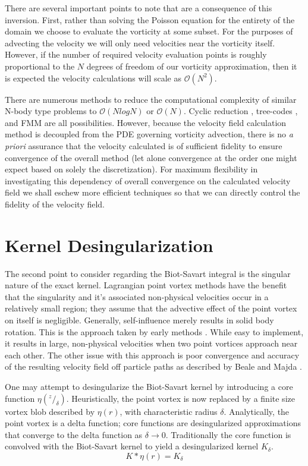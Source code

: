 \documentclass[letterpaper,12pt]{report}
\newcommand{\ben}[1]{\begin{equation}\label{#1}}
\newcommand{\ee}{\end{equation}}
\begin{document}
There are several important points to note that are a consequence of this inversion. First, rather than solving the Poisson equation for the entirety of the domain we choose to evaluate the vorticity at some subset. For the purposes of advecting the velocity we will only need velocities near the vorticity itself. However, if the number of required velocity evaluation points is roughly proportional to the $N$ degrees of freedom of our vorticity approximation, then it is expected the velocity calculations will scale as $\mathcal{O}(N^2)$.

There are numerous methods to reduce the computational complexity of similar N-body type problems to $\mathcal{O}(NlogN)$ or $\mathcal{O}(N)$. Cyclic reduction \cite{SchumannSweet1976}, tree-codes \cite{LindsayKrasny2001,BarnesHut1986}, and FMM \cite{GreengardRokhlin1987} are all possibilities. However, because the velocity field calculation method is decoupled from the PDE governing vorticity advection, there is no \textit{a priori} assurance that the velocity calculated is of sufficient fidelity to ensure convergence of the overall method (let alone convergence at the order one might expect based on solely the discretization). For maximum flexibility in investigating this dependency of overall convergence on the calculated velocity field we shall eschew more efficient techniques so that we can directly control the fidelity of the velocity field.

\section{Kernel Desingularization} 
The second point to consider regarding the Biot-Savart integral is the singular nature of the exact kernel. Lagrangian point vortex methods have the benefit that the singularity and it's associated non-physical velocities occur in a relatively small region; they assume that the advective effect of the point vortex on itself is negligible. Generally, self-influence merely results in solid body rotation. This is the approach taken by early methods \cite{Point1}. While easy to implement, it results in large, non-physical velocities when two point vortices approach near each other. The other issue with this approach is poor convergence and accuracy of the resulting velocity field off particle paths as described by Beale and Majda \cite{BealeMajda}.

One may attempt to desingularize the Biot-Savart kernel  by introducing a core function $\eta(^z/_{\delta})$. Heuristically, the point vortex is now replaced by a finite size vortex blob described by $\eta(r)$, with characteristic radius $\delta$. Analytically, the point vortex is a delta function; core functions are desingularized approximations that converge to the delta function as $\delta \rightarrow 0$. Traditionally the core function is convolved with the Biot-Savart kernel to yield a desingularized kernel $K_{\delta}$.
\ben{DesingBS} K*\eta(r) = K_{\delta} \ee
\end{document}
